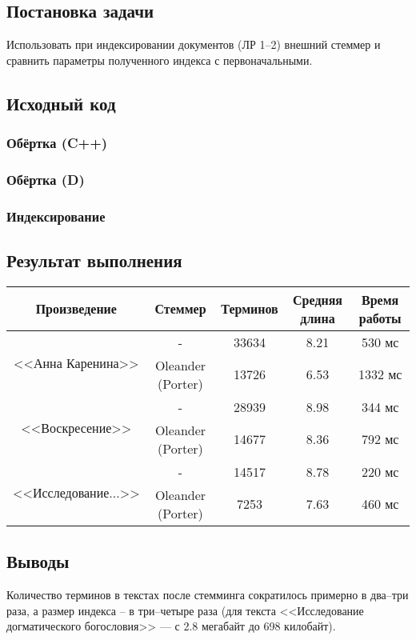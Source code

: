 \documentclass[a4paper, 12pt]{article}
\begin{document}

\newpage


\subsection*{Постановка задачи}
Использовать при индексировании документов (ЛР 1--2) внешний стеммер и сравнить параметры полученного индекса с первоначальными.


\subsection*{Исходный код}

\subsubsection*{Обёртка (C++)}


\subsubsection*{Обёртка (D)}


\newpage
\subsubsection*{Индексирование}



\newpage
\subsection*{Результат выполнения}


\vspace{1em}

\begin{tabular}{|c|c|c|c|c|}
\hline
Произведение & Стеммер & Терминов & Средняя длина & Время работы \\
\hline
\multirow{2}{*}{<<Анна Каренина>>}   & -                 & 33634 & 8.21 & 530 мс  \\
\cline{2-5}
                                     & Oleander (Porter) & 13726 & 6.53 & 1332 мс \\
\hline
\multirow{2}{*}{<<Воскресение>>}     & -                 & 28939 & 8.98 & 344 мс  \\
\cline{2-5}
                                     & Oleander (Porter) & 14677 & 8.36 & 792 мс  \\
\hline
\multirow{2}{*}{<<Исследование...>>} & -                 & 14517 & 8.78 & 220 мс  \\
\cline{2-5}
                                     & Oleander (Porter) & 7253  & 7.63 & 460 мс  \\
\hline
\end{tabular}


\vspace{1em}

\subsection*{Выводы}
Количество терминов в текстах после стемминга сократилось примерно в два--три раза, а размер индекса -- в три--четыре раза (для текста <<Исследование догматического богословия>> --- с 2.8 мегабайт до 698 килобайт).
\end{document}
